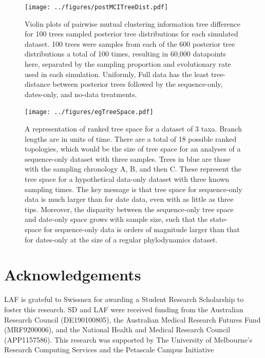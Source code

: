 \documentclass{article}
\begin{document}
\begin{figure}[H]
\centering
\texttt{[image: ../figures/postMCITreeDist.pdf]}
\caption{Violin plots of pairwise mutual clustering information tree difference for 100 trees sampled posterior tree distributions for each simulated dataset. 100 trees were samples from each of the 600 posterior tree distributions a total of 100 times, resulting in 60,000 datapoints here, separated by the sampling proportion and evolutionary rate used in each simulation. Uniformly, Full data has the least tree-distance between posterior trees followed by the sequence-only, dates-only, and no-data treatments.}
\label{fig:ptreeDist}
\end{figure}

\begin{figure}[H]
\centering
\texttt{[image: ../figures/egTreeSpace.pdf]}
\caption{A representation of ranked tree space for a dataset of 3 taxa. Branch lengths are in units of time. There are a total of 18 possible ranked topologies, which would be the size of tree space for an analyses of a sequence-only dataset with three samples. Trees in blue are those with the sampling chronology A, B, and then C. These represent the tree space for a hypothetical data-only dataset with three known sampling times. The key message is that tree space for sequence-only data is much larger than for date data, even with as little as three tips. Moreover, the disparity between the sequence-only tree space and date-only space grows with sample size, such that the state-space for sequence-only data is orders of magnitude larger than that for dates-only at the size of a regular phylodynamics dataset.}
\label{fig:treeSpace}
\end{figure}

\section*{Acknowledgements}
LAF is grateful to Swissnex for awarding a Student Research Scholarship to foster this research. SD and LAF were received funding from the Australian Research Council (DE190100805), the Australian Medical Research Futures Fund (MRF9200006), and the National Health and Medical Research Council (APP1157586). This research was supported by The University of Melbourne’s Research Computing Services and the Petascale Campus Initiative
%
\end{document}
